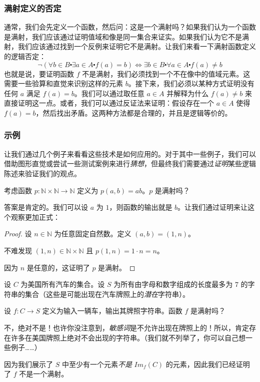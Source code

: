 \subsubsection*{满射定义的否定}

通常，我们会先定义一个函数，然后问：这是一个满射吗？如果我们认为一个函数是满射，我们应该通过证明值域和像是同一集合来证实。如果我们认为它不是满射，我们应该通过找到一个反例来证明它不是满射。让我们来看一下满射函数定义的逻辑否定：
\[\neg (\forall b \in B \centerdot \exists a \in A \centerdot f(a) = b) \iff \exists b \in B \centerdot \forall a \in A \centerdot f(a) \ne b\]
也就是说，要证明函数 $f$ 不是满射，我们必须找到一个不在像中的值域元素。这需要一些验算和直觉来识别这样的元素 $b$。接下来，我们必须以某种方式证明没有任何 $a$ 满足 $f(a) = b$。我们可以通过取任意 $a \in A$ 并解释为什么 $f(a) \ne b$ 来直接证明这一点。或者，我们可以通过反证法来证明：假设存在一个 $a \in A$ 使得 $f(a) = b$，然后找出矛盾。这两种方法都是合理的，并且是逻辑等价的。

\subsubsection*{示例}

让我们通过几个例子来看看这些技术是如何应用的。对于其中一些例子，我们可以借助图形直觉或尝试一些测试案例来进行\emph{猜想}，但最终我们需要通过\emph{证明}某些逻辑陈述来验证我们的观点。\\

\begin{example}
    考虑函数 $p : \mathbb{N} \times \mathbb{N} \to \mathbb{N}$ 定义为 $p(a,b) = ab$。$p$ 是满射吗？

    答案是肯定的。我们可以设 $a$ 为 $1$，则函数的输出就是 $b$。让我们通过证明来让这个观察更加正式：

    \begin{proof}
        设 $n \in \mathbb{N}$ 为任意固定自然数。定义 $(a, b) = (1, n)$。

        不难发现 $(1, n) \in \mathbb{N} \times \mathbb{N}$ 且 $p(1, n) = 1 \cdot n = n$。

        因为 $n$ 是任意的，这证明了 $p$ 是满射。
    \end{proof}
\end{example}

\begin{example}
    设 $C$ 为美国所有汽车的集合。设 $S$ 为所有由字母和数字组成的长度最多为 $7$ 的字符串的集合（这些是可能出现在汽车牌照上的\emph{潜在}字符串）。

    设 $f : C \to S$ 定义为输入一辆车，输出其牌照字符串。函数 $f$ 是满射吗？

    不，绝对不是！也许你没注意到，\emph{敏感词}是不允许出现在牌照上的！所以，肯定存在许多在美国牌照上绝对不会出现的字符串。（我们就不列举了，你可以自己想一些例子……）

    因为我们展示了 $S$ 中至少有一个元素\emph{不是} $Im_f (C)$ 的元素，因此我们已经证明了 $f$ 不是一个满射。
\end{example}

